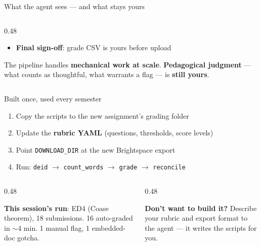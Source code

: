 \documentclass[aspectratio=169, 10pt]{beamer}
\begin{document}
\begin{frame}{What the agent sees --- and what stays yours}
\begin{columns}[T]
\begin{column}{0.48\textwidth}
\begin{tcolorbox}[keybox, title={\faUserCheck\quad Your judgment}]
\begin{itemize}
  \item \textbf{Final sign-off}: grade CSV is yours before upload
\end{itemize}
\end{tcolorbox}
\vskip3pt
\begin{tcolorbox}[accentbox, top=3pt, bottom=3pt]
\scriptsize
The pipeline handles \textbf{mechanical work at scale}. \textbf{Pedagogical judgment} --- what counts as thoughtful, what warrants a flag --- is \textbf{still yours}.
\end{tcolorbox}
\end{column}
\end{columns}
\end{frame}

\begin{frame}{Built once, used every semester}
\vskip2pt
\begin{tcolorbox}[keybox, title={\faCog\quad To reuse for the next assignment}]
\small
\begin{enumerate}\setlength{\itemsep}{2pt}
  \item Copy the scripts to the new assignment's grading folder
  \item Update the \textbf{rubric YAML} (questions, thresholds, score levels)
  \item Point \texttt{DOWNLOAD\_DIR} at the new Brightspace export
  \item Run: \texttt{deid} $\rightarrow$ \texttt{count\_words} $\rightarrow$ \texttt{grade} $\rightarrow$ \texttt{reconcile}
\end{enumerate}
\end{tcolorbox}
\vskip4pt
\begin{columns}[T]
\begin{column}{0.48\textwidth}
\begin{tcolorbox}[quotebox, top=3pt, bottom=3pt]
\small
\textbf{This session's run}: ED4 (Coase theorem), 18 submissions. 16 auto-graded in $\sim$4 min. 1 manual flag, 1 embedded-doc gotcha.
\end{tcolorbox}
\end{column}
\begin{column}{0.48\textwidth}
\begin{tcolorbox}[accentbox, top=3pt, bottom=3pt]
\small
\textbf{Don't want to build it?} Describe your rubric and export format to the agent --- it writes the scripts for you.
\end{tcolorbox}
\end{column}
\end{columns}
\end{frame}
\end{document}
